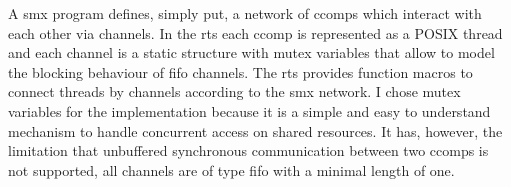 A \gls*{smx} program defines, simply put, a network of \glspl*{ccomp} which interact with each other via channels.
In the \gls{rts} each \gls*{ccomp} is represented as a POSIX thread and each channel is a static structure with mutex variables that allow to model the blocking behaviour of \gls{fifo} channels.
The \gls{rts} provides function macros to connect threads by channels according to the \gls*{smx} network.
I chose mutex variables for the implementation because it is a simple and easy to understand mechanism to handle concurrent access on shared resources.
It has, however, the limitation that unbuffered synchronous communication between two \glspl*{ccomp} is not supported, \ie all channels are of type \gls{fifo} with a minimal length of one.

